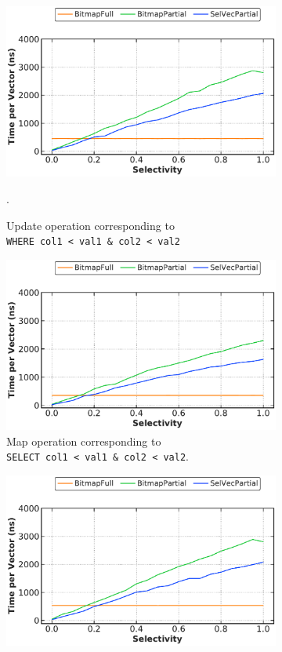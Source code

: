 \documentclass[12pt]{cmuthesis}
\begin{document}
\begin{figure}[t!]
\centering
\begin{subfigure}[t]{.49\linewidth}
 \centering
 \includegraphics[width=0.9\linewidth]{eval/bitwise_and_update.pdf}
 \caption{Update operation corresponding to \\ \texttt{\footnotesize WHERE col1 < val1 \& col2 < val2}}.
  \label{fig:bitwise_and_update}
\end{subfigure}%
\begin{subfigure}[t]{.49\linewidth}
 \centering
 \includegraphics[width=0.9\linewidth]{eval/bitwise_and_map.pdf}
 \caption{Map operation corresponding to \\ \texttt{\footnotesize SELECT col1 < val1 \& col2 < val2}.}
  \label{fig:bitwise_and_map}
\end{subfigure}
\begin{subfigure}[t]{.49\linewidth}
 \centering
 \includegraphics[width=0.9\linewidth]{eval/bitwise_or_update.pdf}

\end{subfigure}
\end{figure}
\end{document}
